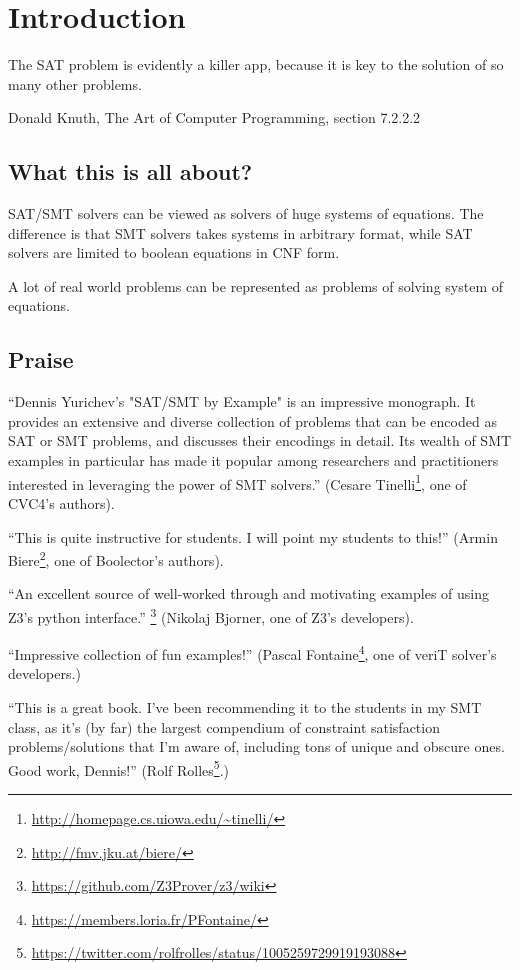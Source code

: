 \chapter{Introduction}

\epigraph{The SAT problem is evidently a killer app, because it is key to the solution of so many other problems.}
{Donald Knuth, The Art of Computer Programming, section 7.2.2.2}

\section{What this is all about?}

\ac{SAT}/\ac{SMT} solvers can be viewed as solvers of huge systems of equations.
The difference is that \ac{SMT} solvers takes systems in arbitrary format,
while \ac{SAT} solvers are limited to boolean equations in \ac{CNF} form.

A lot of real world problems can be represented as problems of solving system of equations.

\section{Praise}

``Dennis Yurichev's "SAT/SMT by Example" is an impressive monograph. It provides an extensive and diverse collection of problems that
can be encoded as SAT or SMT problems, and discusses their encodings in detail. Its wealth of SMT examples in particular has made it
popular among researchers and practitioners interested in leveraging the power of SMT solvers.''
(Cesare Tinelli\footnote{\url{http://homepage.cs.uiowa.edu/~tinelli/}}, one of CVC4's authors).

``This is quite instructive for students. I will point my students to this!'' (Armin Biere\footnote{\url{http://fmv.jku.at/biere/}}, one of Boolector's authors).

``An excellent source of well-worked through and motivating examples of using Z3's python interface.''
\footnote{\url{https://github.com/Z3Prover/z3/wiki}}
(Nikolaj Bjorner, one of Z3's developers).

``Impressive collection of fun examples!''
(Pascal Fontaine\footnote{\url{https://members.loria.fr/PFontaine/}}, one of veriT solver's developers.)

``This is a great book. I've been recommending it to the students in my SMT class, as it's (by far) the largest compendium of constraint satisfaction problems/solutions that I'm aware of, including tons of unique and obscure ones. Good work, Dennis!''
(Rolf Rolles\footnote{\url{https://twitter.com/rolfrolles/status/1005259729919193088}}.)

